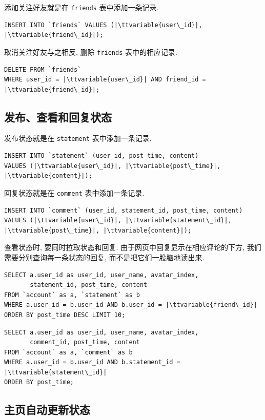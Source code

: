 \documentclass[a4paper,10pt]{article}
\newcommand{\ttvariable}[1]{\texttt{\textit{#1}}}
\begin{document}
添加关注好友就是在 \texttt{friends} 表中添加一条记录.
\begin{verbatim}
INSERT INTO `friends` VALUES (|\ttvariable{user\_id}|, |\ttvariable{friend\_id}|);
\end{verbatim}

取消关注好友与之相反, 删除 \texttt{friends} 表中的相应记录.
\begin{verbatim}
DELETE FROM `friends`
WHERE user_id = |\ttvariable{user\_id}| AND friend_id = |\ttvariable{friend\_id}|;
\end{verbatim}

\subsection{发布、查看和回复状态}

发布状态就是在 \texttt{statement} 表中添加一条记录.
\begin{verbatim}
INSERT INTO `statement` (user_id, post_time, content)
VALUES (|\ttvariable{user\_id}|, |\ttvariable{post\_time}|, |\ttvariable{content}|);
\end{verbatim}

回复状态就是在 \texttt{comment} 表中添加一条记录.
\begin{verbatim}
INSERT INTO `comment` (user_id, statement_id, post_time, content)
VALUES (|\ttvariable{user\_id}|, |\ttvariable{statement\_id}|, |\ttvariable{post\_time}|, |\ttvariable{content}|);
\end{verbatim}

查看状态时, 要同时拉取状态和回复. 由于网页中回复显示在相应评论的下方, 我们需要分别查询每一条状态的回复, 而不是把它们一股脑地读出来.
\begin{verbatim}
SELECT a.user_id as user_id, user_name, avatar_index,
       statement_id, post_time, content
FROM `account` as a, `statement` as b
WHERE a.user_id = b.user_id AND b.user_id = |\ttvariable{friend\_id}|
ORDER BY post_time DESC LIMIT 10;
\end{verbatim}
\begin{verbatim}
SELECT a.user_id as user_id, user_name, avatar_index,
       comment_id, post_time, content
FROM `account` as a, `comment` as b
WHERE a.user_id = b.user_id AND b.statement_id = |\ttvariable{statement\_id}|
ORDER BY post_time;
\end{verbatim}

\subsection{主页自动更新状态}
\end{document}
